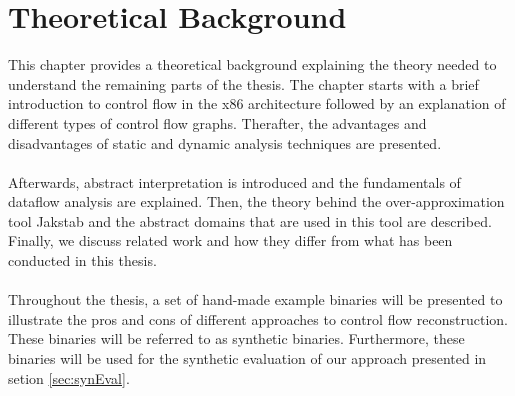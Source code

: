 \documentclass{kththesis}
\newcommand{\fbcomment}[1]{{#1}}
\renewcommand{\fbcomment}[1]{}
\begin{document}
\chapter{Theoretical Background}\label{chap:background}
\fbcomment{\color{red}Goal: Provide enough background information to understand the concepts of the thesis and give the thesis context.}
This chapter provides a theoretical background explaining the theory needed to understand the remaining parts of the thesis. The chapter starts with a brief introduction to control flow in the x86 architecture followed by an explanation of different types of control flow graphs. Therafter, the advantages and disadvantages of static and dynamic analysis techniques are presented. 
\\ \\
Afterwards, abstract interpretation is introduced and the fundamentals of dataflow analysis are explained. Then, the theory behind the over-approximation tool Jakstab and the abstract domains that are used in this tool are described. Finally, we discuss related work and how they differ from what has been conducted in this thesis.
\\ \\
Throughout the thesis, a set of hand-made example binaries will be presented to illustrate the pros and cons of different approaches to control flow reconstruction. These binaries will be referred to as synthetic binaries. Furthermore, these binaries will be used for the synthetic evaluation of our approach presented in setion \ref{sec:synEval}.

\clearpage
\end{document}
